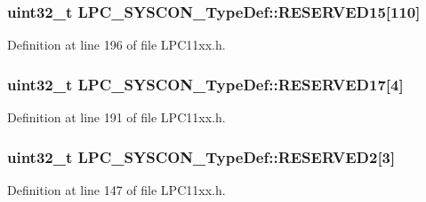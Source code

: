 \subsubsection[{\texorpdfstring{R\+E\+S\+E\+R\+V\+E\+D15}{RESERVED15}}]{\setlength{\rightskip}{0pt plus 5cm}uint32\+\_\+t L\+P\+C\+\_\+\+S\+Y\+S\+C\+O\+N\+\_\+\+Type\+Def\+::\+R\+E\+S\+E\+R\+V\+E\+D15\mbox{[}110\mbox{]}}\hypertarget{group___l_p_c11xx___definitions_gae7315f0a0ee0dc2a8e76d8bcd6f7d3cb}{}\label{group___l_p_c11xx___definitions_gae7315f0a0ee0dc2a8e76d8bcd6f7d3cb}


Definition at line 196 of file L\+P\+C11xx.\+h.

\subsubsection[{\texorpdfstring{R\+E\+S\+E\+R\+V\+E\+D17}{RESERVED17}}]{\setlength{\rightskip}{0pt plus 5cm}uint32\+\_\+t L\+P\+C\+\_\+\+S\+Y\+S\+C\+O\+N\+\_\+\+Type\+Def\+::\+R\+E\+S\+E\+R\+V\+E\+D17\mbox{[}4\mbox{]}}\hypertarget{group___l_p_c11xx___definitions_ga0eb8d59fb969826b0b27b5527016d5f5}{}\label{group___l_p_c11xx___definitions_ga0eb8d59fb969826b0b27b5527016d5f5}


Definition at line 191 of file L\+P\+C11xx.\+h.

\subsubsection[{\texorpdfstring{R\+E\+S\+E\+R\+V\+E\+D2}{RESERVED2}}]{\setlength{\rightskip}{0pt plus 5cm}uint32\+\_\+t L\+P\+C\+\_\+\+S\+Y\+S\+C\+O\+N\+\_\+\+Type\+Def\+::\+R\+E\+S\+E\+R\+V\+E\+D2\mbox{[}3\mbox{]}}\hypertarget{group___l_p_c11xx___definitions_gaadb6b4a71da6b8f321e2e4080864b1c1}{}\label{group___l_p_c11xx___definitions_gaadb6b4a71da6b8f321e2e4080864b1c1}


Definition at line 147 of file L\+P\+C11xx.\+h.

